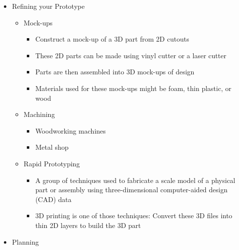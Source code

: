 \begin{itemize}
  \item Refining your Prototype

    \begin{itemize}

      \item Mock-ups

        \begin{itemize}

          \item Construct a mock-up of a 3D part from 2D cutouts

          \item These 2D parts can be made using vinyl cutter or a laser cutter

          \item Parts are then assembled into 3D mock-ups of design

          \item Materials used for these mock-ups might be foam, thin plastic, or wood

        \end{itemize}

      \item Machining

        \begin{itemize}

          \item Woodworking machines

          \item Metal shop

        \end{itemize}

      \item Rapid Prototyping

        \begin{itemize}

          \item A group of techniques used to fabricate a scale model of a physical part or assembly using three-dimensional computer-aided design (CAD) data

          \item 3D printing is one of those techniques: Convert these 3D files into thin 2D layers to build the 3D part

        \end{itemize}

    \end{itemize}

  \item Planning


\end{itemize}
